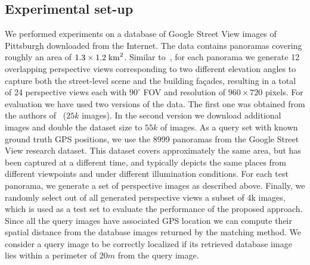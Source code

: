 \documentclass[table]{article} %
\begin{document}
   	\subsection{Experimental set-up}
		We performed experiments on a database of Google Street View images of Pittsburgh downloaded from the Internet. The data contains panoramas covering roughly an area of $1.3 \times 1.2 \; {\rm km}^2$. 		
		Similar to~\cite{Chen11}, for each panorama we generate 12 overlapping perspective views corresponding to two different elevation angles to capture both the street-level scene and the building fa\c{c}ades, resulting in a total of 24 perspective views each with $90^\circ$ FOV and resolution of $960 \times 720$ pixels.
		For evaluation we have used two versions of the data. The first one was obtained from the authors of~\cite{Gronat13} ($25k$ images). In the second version we download additional images and double the dataset size to $55k$ of images. 
		As a query set with known ground truth GPS positions, we use the 8999 panoramas from the Google Street View research dataset. This dataset covers approximately the same area, but has been captured at a different time, and typically depicts the same places from different viewpoints and under different illumination conditions. For each test panorama, we generate a set of perspective images as described above. Finally, we randomly select out of all generated perspective views a subset of 4k images, which is used as a test set to evaluate the performance of the proposed approach.
			Since all the query images have associated GPS location we can compute their spatial distance from the database images returned by the matching method. We consider a query image to be correctly localized if its retrieved database image lies within a perimeter of $20m$ from the query image.
\end{document}
